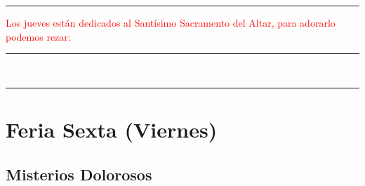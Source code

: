 \documentclass[10pt,twoside]{book}
\begin{document}
\iralfinal

\begin{center}
      {\rule{10em}{0.4pt}}

      \vspace{0.75em}

      \textcolor{red}{Los jueves están dedicados al Santísimo Sacramento del Altar, para adorarlo podemos rezar:}
\end{center}

\begin{multicols}{2}
      
\end{multicols}

\begin{center}
      \begin{spacing}{0.25}
            {\rule{20em}{0.4pt}}\\
            {\rule{20em}{0.4pt}}
      \end{spacing}
\end{center}


\section*{\centering Feria Sexta (Viernes)}

\noindent\subsection*{Misterios Dolorosos}

\vspace{1.5em}

\noindent{}


\vspace{0.5em}



\vspace{0.5em}

\noindent{}


\vspace{0.5em}



\vspace{0.5em}
\end{document}
